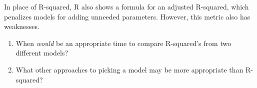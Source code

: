 \documentclass[]{article}
\begin{document}
In place of R-squared, R also shows a formula for an adjusted R-squared,
which penalizes models for adding unneeded parameters. However, this
metric also has weaknesses.

\begin{enumerate}
\def\labelenumi{\arabic{enumi}.}
\setcounter{enumi}{6}
\item
  When \emph{would} be an appropriate time to compare R-squared's from
  two different models?
\item
  What other approaches to picking a model may be more appropriate than
  R-squared?
\end{enumerate}
\end{document}
